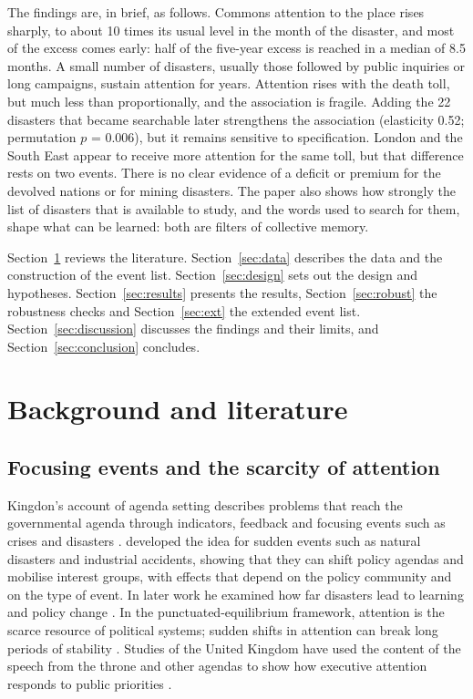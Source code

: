 \documentclass[11pt,a4paper]{article}
\begin{document}
The findings are, in brief, as follows. Commons attention to the place rises sharply, to about 10 times its usual level in the month of the disaster, and most of the excess comes early: half of the five-year excess is reached in a median of 8.5 months. A small number of disasters, usually those followed by public inquiries or long campaigns, sustain attention for years. Attention rises with the death toll, but much less than proportionally, and the association is fragile. Adding the 22 disasters that became searchable later strengthens the association (elasticity 0.52; permutation $p$ = 0.006), but it remains sensitive to specification. London and the South East appear to receive more attention for the same toll, but that difference rests on two events. There is no clear evidence of a deficit or premium for the devolved nations or for mining disasters. The paper also shows how strongly the list of disasters that is available to study, and the words used to search for them, shape what can be learned: both are filters of collective memory.

Section~\ref{sec:lit} reviews the literature. Section~\ref{sec:data} describes the data and the construction of the event list. Section~\ref{sec:design} sets out the design and hypotheses. Section~\ref{sec:results} presents the results, Section~\ref{sec:robust} the robustness checks and Section~\ref{sec:ext} the extended event list. Section~\ref{sec:discussion} discusses the findings and their limits, and Section~\ref{sec:conclusion} concludes.

\section{Background and literature}
\label{sec:lit}
\subsection{Focusing events and the scarcity of attention}
Kingdon's account of agenda setting describes problems that reach the governmental agenda through indicators, feedback and focusing events such as crises and disasters \citep{Kingdon1984}. \citet{Birkland1997,Birkland1998} developed the idea for sudden events such as natural disasters and industrial accidents, showing that they can shift policy agendas and mobilise interest groups, with effects that depend on the policy community and on the type of event. In later work he examined how far disasters lead to learning and policy change \citep{Birkland2006}. In the punctuated-equilibrium framework, attention is the scarce resource of political systems; sudden shifts in attention can break long periods of stability \citep{BaumgartnerJones1993,JonesBaumgartner2005}. Studies of the United Kingdom have used the content of the speech from the throne and other agendas to show how executive attention responds to public priorities \citep{JenningsJohn2009,John2013}.
\end{document}
